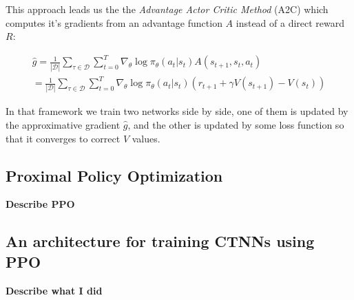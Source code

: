 This approach leads us the the \textit{Advantage Actor Critic Method} (A2C) which computes it's gradients from an advantage function $A$ instead of a direct reward $R$:

\begin{align*}
    \hat{g} = \frac{1}{|\mathcal{D}|} \sum_{\tau \in \mathcal{D}} \sum_{t=0}^{T} \nabla_\theta \log \pi_\theta (a_t|s_t) A(s_{t+1},s_t,a_t)\\
    = \frac{1}{|\mathcal{D}|} \sum_{\tau \in \mathcal{D}} \sum_{t=0}^{T} \nabla_\theta \log \pi_\theta (a_t|s_t) (r_{t+1} + \gamma V(s_{t+1}) - V(s_t))
\end{align*}

In that framework we train two networks side by side, one of them is updated by the approximative gradient $\hat{g}$, and the other is updated by some loss function so that it converges to correct $V$ values.

\subsection{Proximal Policy Optimization}
\label{sec:ppo}
\textbf{Describe PPO}

\subsection{An architecture for training CTNNs using PPO}

\textbf{Describe what I did}
